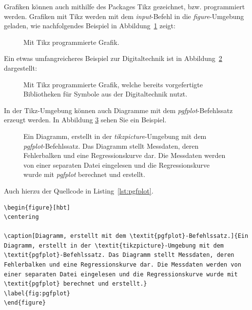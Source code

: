 Grafiken können auch mithilfe des Packages Tikz gezeichnet, bzw. programmiert werden. Grafiken mit Tikz werden mit dem \textit{input}-Befehl in die \textit{figure}-Umgebung geladen, wie nachfolgendes Beispiel in Abbildung~\ref{fig:tikz_house} zeigt:

\begin{figure}[hbt]
	\centering
	
	\caption[Mit Tikz programmierte Grafik.]{Mit Tikz programmierte Grafik.}
	\label{fig:tikz_house}
\end{figure}

Ein etwas umfangreicheres Beispiel zur Digitaltechnik ist in Abbildung~\ref{fig:tikz_digital} dargestellt:

\begin{figure}[hbt]
	\centering
	
	\caption[Mit Tikz programmierte Grafik, welche bereits vorgefertigte Bibliotheken für Symbole aus der Digitaltechnik nutzt.]{Mit Tikz programmierte Grafik, welche bereits vorgefertigte Bibliotheken für Symbole aus der Digitaltechnik nutzt.}
	\label{fig:tikz_digital}
\end{figure}


In der Tikz-Umgebung können auch Diagramme mit dem \textit{pgfplot}-Befehlssatz erzeugt werden. In Abbildung \ref{fig:pgfplot} sehen Sie ein Beispiel.

\begin{figure}[hbt]
	\centering
	
	\caption[Diagramm, erstellt mit dem \textit{pgfplot}-Befehlssatz.]{Ein Diagramm, erstellt in der \textit{tikzpicture}-Umgebung mit dem \textit{pgfplot}-Befehlssatz. Das Diagramm stellt Messdaten, deren Fehlerbalken und eine Regressionskurve dar. Die Messdaten werden von einer separaten Datei eingelesen und die Regressionskurve wurde mit \textit{pgfplot} berechnet und erstellt.}
	\label{fig:pgfplot}
\end{figure}

Auch hierzu der Quellcode in Listing~\ref{lst:pgfplot}.

\begin{minipage}{\linewidth}
\begin{lstlisting}[caption=Quellcode der Abbildung~\ref{fig:pgfplot}.,label=lst:pgfplot]
\begin{figure}[hbt]
\centering

\caption[Diagramm, erstellt mit dem \textit{pgfplot}-Befehlssatz.]{Ein Diagramm, erstellt in der \textit{tikzpicture}-Umgebung mit dem \textit{pgfplot}-Befehlssatz. Das Diagramm stellt Messdaten, deren Fehlerbalken und eine Regressionskurve dar. Die Messdaten werden von einer separaten Datei eingelesen und die Regressionskurve wurde mit \textit{pgfplot} berechnet und erstellt.}
\label{fig:pgfplot}
\end{figure}
\end{lstlisting}
\end{minipage}

